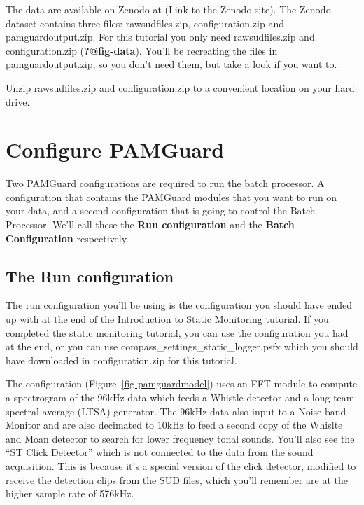\documentclass[
]{article}
\begin{document}
The data are available on Zenodo at (Link to the Zenodo site). The
Zenodo dataset contains three files: rawsudfiles.zip, configuration.zip
and pamguardoutput.zip. For this tutorial you only need rawsudfiles.zip
and configuration.zip (\textbf{?@fig-data}). You'll be recreating the
files in pamguardoutput.zip, so you don't need them, but take a look if
you want to.

Unzip rawsudfiles.zip and configuration.zip to a convenient location on
your hard drive.

\section{Configure PAMGuard}\label{configure-pamguard}

Two PAMGuard configurations are required to run the batch processor. A
configuration that contains the PAMGuard modules that you want to run on
your data, and a second configuration that is going to control the Batch
Processor. We'll call these the \textbf{Run configuration} and the
\textbf{Batch Configuration} respectively.

\subsection{The Run configuration}\label{the-run-configuration}

The run configuration you'll be using is the configuration you should
have ended up with at the end of the
\href{https://www.pamguard.org/tutorials/staticmonitoring.html}{Introduction
to Static Monitoring} tutorial. If you completed the static monitoring
tutorial, you can use the configuration you had at the end, or you can
use compass\_settings\_static\_logger.psfx which you should have
downloaded in configuration.zip for this tutorial.

The configuration (Figure~\ref{fig-pamguardmodel}) uses an FFT module to
compute a spectrogram of the 96kHz data which feeds a Whistle detector
and a long team spectral average (LTSA) generator. The 96kHz data also
input to a Noise band Monitor and are also decimated to 10kHz fo feed a
second copy of the Whislte and Moan detector to search for lower
frequency tonal sounds. You'll also see the ``ST Click Detector'' which
is not connected to the data from the sound acquisition. This is because
it's a special version of the click detector, modified to receive the
detection clips from the SUD files, which you'll remember are at the
higher sample rate of 576kHz.
\end{document}

